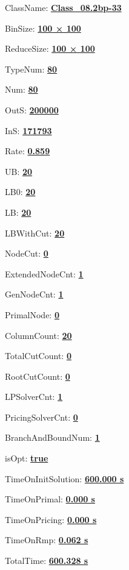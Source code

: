 \documentclass[11pt]{article}
\begin{document}
\pagestyle{empty}


ClassName: \underline{\textbf{Class_08.2bp-33}}
\par
BinSize: \underline{\textbf{100 × 100}}
\par
ReduceSize: \underline{\textbf{100 × 100}}
\par
TypeNum: \underline{\textbf{80}}
\par
Num: \underline{\textbf{80}}
\par
OutS: \underline{\textbf{200000}}
\par
InS: \underline{\textbf{171793}}
\par
Rate: \underline{\textbf{0.859}}
\par
UB: \underline{\textbf{20}}
\par
LB0: \underline{\textbf{20}}
\par
LB: \underline{\textbf{20}}
\par
LBWithCut: \underline{\textbf{20}}
\par
NodeCut: \underline{\textbf{0}}
\par
ExtendedNodeCnt: \underline{\textbf{1}}
\par
GenNodeCnt: \underline{\textbf{1}}
\par
PrimalNode: \underline{\textbf{0}}
\par
ColumnCount: \underline{\textbf{20}}
\par
TotalCutCount: \underline{\textbf{0}}
\par
RootCutCount: \underline{\textbf{0}}
\par
LPSolverCnt: \underline{\textbf{1}}
\par
PricingSolverCnt: \underline{\textbf{0}}
\par
BranchAndBoundNum: \underline{\textbf{1}}
\par
isOpt: \underline{\textbf{true}}
\par
TimeOnInitSolution: \underline{\textbf{600.000 s}}
\par
TimeOnPrimal: \underline{\textbf{0.000 s}}
\par
TimeOnPricing: \underline{\textbf{0.000 s}}
\par
TimeOnRmp: \underline{\textbf{0.062 s}}
\par
TotalTime: \underline{\textbf{600.328 s}}
\par
\newpage


\end{document}
